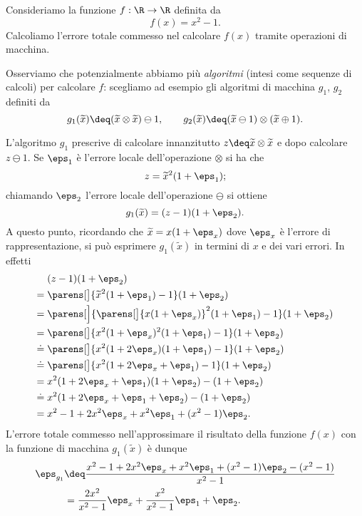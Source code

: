 \begin{example}
    \label{exmpl:func_error}
Consideriamo la funzione $f : \R \to \R$ definita da \[
    f(x) = x^2 - 1.
\]
Calcoliamo l'errore totale commesso nel calcolare $f(x)$ tramite operazioni di macchina.

Osserviamo che potenzialmente abbiamo più \emph{algoritmi} (intesi come sequenze di calcoli) per calcolare $f$: scegliamo ad esempio gli algoritmi di macchina $g_1$, $g_2$ definiti da \[
    g_1(\tilde x) \deq (\tilde x \otimes \tilde x) \ominus 1, \qquad g_2(\tilde x) \deq (\tilde x \ominus 1) \otimes (\tilde x \oplus 1).
\] 

L'algoritmo $g_1$ prescrive di calcolare innanzitutto $z \deq \tilde x \otimes \tilde x$ e dopo calcolare $z \ominus 1$. Se $\eps_1$ è l'errore locale dell'operazione $\otimes$ si ha che \[
    z = \tilde{x}^2 (1 + \eps_1);
\] chiamando $\eps_2$ l'errore locale dell'operazione $\ominus$ si ottiene \begin{equation*}
    g_1(\tilde x) = (z - 1)(1 + \eps_2).
\end{equation*}
A questo punto, ricordando che $\tilde x = x(1 + \eps_x)$ dove $\eps_x$ è l'errore di rappresentazione, si può esprimere $g_1(\tilde x)$ in termini di $x$ e dei vari errori. In effetti
\begin{align*}
        &(z - 1)(1 + \eps_2)\\
    = {}&\parens[\big]{\tilde{x}^2 (1 + \eps_1) - 1}(1 + \eps_2)\\
    = {}&\parens[\Big]{\parens[\big]{x(1+\eps_x)}^2(1 + \eps_1) - 1}(1 + \eps_2)\\
    = {}&\parens[\big]{x^2(1+\eps_x)^2(1 + \eps_1) - 1}(1 + \eps_2)\\
    \doteq {}&\parens[\big]{x^2(1+2\eps_x)(1 + \eps_1) - 1}(1 + \eps_2)\\
    \doteq {}&\parens[\big]{x^2(1+2\eps_x + \eps_1) - 1}(1 + \eps_2)\\
    = {}&x^2(1+2\eps_x + \eps_1)(1 + \eps_2) - (1 + \eps_2)\\
    \doteq {}&x^2(1 + 2\eps_x + \eps_1 + \eps_2) - (1 + \eps_2)\\
    = {}&x^2 -1 + 2x^2\eps_x + x^2\eps_1 + (x^2-1)\eps_2.
\end{align*}
L'errore totale commesso nell'approssimare il risultato della funzione $f(x)$ con la funzione di macchina $g_1(\tilde x)$ è dunque \begin{align*}
    \eps_{g_1} &\deq \frac{x^2 -1 + 2x^2\eps_x + x^2\eps_1 + (x^2-1)\eps_2 - (x^2-1)}{x^2 - 1}\\
    &= \frac{2x^2}{x^2 - 1}\eps_x + \frac{x^2}{x^2-1}\eps_1 + \eps_2.
\end{align*}


\end{example}

